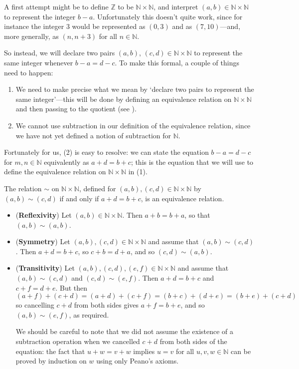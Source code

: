 A first attempt might be to define $\mathbb{Z}$ to be $\mathbb{N} \times \mathbb{N}$, and interpret $(a,b) \in \mathbb{N} \times \mathbb{N}$ to represent the integer $b-a$. Unfortunately this doesn't quite work, since for instance the integer $3$ would be represented as $(0,3)$ and as $(7,10)$---and, more generally, as $(n,n+3)$ for all $n \in \mathbb{N}$.

So instead, we will declare two pairs $(a,b)$, $(c,d) \in \mathbb{N} \times \mathbb{N}$ to represent the same integer whenever $b-a = d-c$. To make this formal, a couple of things need to happen:
\begin{enumerate}[(1)]
\item We need to make precise what we mean by `declare two pairs to represent the same integer'---this will be done by defining an equivalence relation on $\mathbb{N} \times \mathbb{N}$ and then passing to the quotient (see ).
\item We cannot use subtraction in our definition of the equivalence relation, since we have not yet defined a notion of subtraction for $\mathbb{N}$.
\end{enumerate}

Fortunately for us, (2) is easy to resolve: we can state the equation $b-a = d-c$ for $m,n \in \mathbb{N}$ equivalently as $a+d = b+c$; this is the equation that we will use to define the equivalence relation on $\mathbb{N} \times \mathbb{N}$ in (1).

\begin{lemma}
The relation $\sim$ on $\mathbb{N} \times \mathbb{N}$, defined for $(a,b), (c,d) \in \mathbb{N} \times \mathbb{N}$ by $(a,b) \sim (c,d)$ if and only if $a+d=b+c$, is an equivalence relation.
\end{lemma}

\begin{cproof}
\fixlistskip%
\begin{itemize}
\item (\textbf{Reflexivity}) Let $(a,b) \in \mathbb{N} \times \mathbb{N}$. Then $a+b = b+a$, so that $(a,b) \sim (a,b)$.
\item (\textbf{Symmetry}) Let $(a,b), (c,d) \in \mathbb{N} \times \mathbb{N}$ and assume that $(a,b) \sim (c,d)$. Then $a+d=b+c$, so $c+b=d+a$, and so $(c,d) \sim (a,b)$.
\item (\textbf{Transitivity}) Let $(a,b), (c,d), (e,f) \in \mathbb{N} \times \mathbb{N}$ and assume that $(a,b) \sim (c,d)$ and $(c,d) \sim (e,f)$. Then $a+d=b+c$ and $c+f=d+e$. But then
\[ (a + f) + (c + d) = (a+d) + (c+f) = (b+c) + (d+e) = (b+e) + (c+d) \]
so cancelling $c+d$ from both sides gives $a+f = b+e$, and so $(a,b) \sim (e,f)$, as required.

We should be careful to note that we did not assume the existence of a subtraction operation when we cancelled $c+d$ from both sides of the equation: the fact that $u+w=v+w$ implies $u=v$ for all $u,v,w \in \mathbb{N}$ can be proved by induction on $w$ using only Peano's axioms.
\fixlistskip%
\end{itemize}
\end{cproof}

